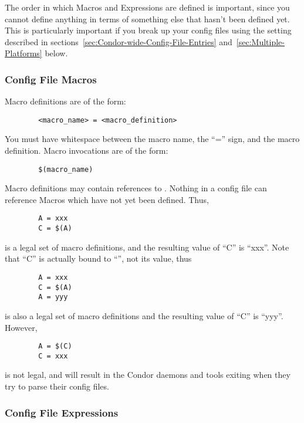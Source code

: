 The order in which Macros and Expressions are defined is important,
since you cannot define anything in terms of something else that
hasn't been defined yet.  This is particularly important if you break
up your config files using the  setting
described in sections~\ref{sec:Condor-wide-Config-File-Entries}
and~\ref{sec:Multiple-Platforms} below.

\subsubsection{\label{sec:Config-File-Macros}
Config File Macros}

Macro definitions are of the form:
\begin{verbatim}
        <macro_name> = <macro_definition>
\end{verbatim}

\Note You must have whitespace between the macro name, the
``='' sign, and the macro definition.  Macro invocations are of the
form: 
\begin{verbatim}
        $(macro_name)
\end{verbatim}
Macro definitions may contain references to .  Nothing in a config file can reference Macros which have
  not yet been defined.  Thus,
\begin{verbatim}
        A = xxx
        C = $(A) 
\end{verbatim}
is a legal set of macro definitions, and the resulting value of ``C'' is
``xxx''.  Note that ``C'' is actually bound to ``'', not its value, thus
\begin{verbatim}
        A = xxx
        C = $(A)
        A = yyy
\end{verbatim}
is also a legal set of macro definitions and the resulting value of
``C'' is ``yyy''.  However, 
\begin{verbatim}
        A = $(C)
        C = xxx
\end{verbatim}
is not legal, and will result in the Condor daemons and tools exiting
when they try to parse their config files.

\subsubsection{\label{sec:Config-File-Expressions}
Config File Expressions}


